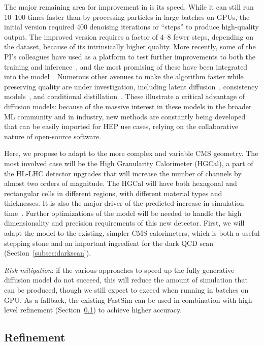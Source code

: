 The major remaining area for improvement in \diffu is its speed.
While it can still run 10--100 times faster than \GEANTfour by processing particles in large batches on GPUs,
the initial version required 400 denoising iterations or ``steps'' to produce high-quality output.
The improved version requires a factor of 4--8 fewer steps, depending on the dataset, because of its intrinsically higher quality.
More recently, some of the PI's colleagues have used \diffu as a platform to test further improvements to both the training and inference~\cite{Jiang:2024ohg},
and the most promising of these have been integrated into the model~\cite{Amram:GitHub}.
Numerous other avenues to make the algorithm faster while preserving quality are under investigation,
including latent diffusion~\cite{Rombach:2022}, consistency models~\cite{Song:2023}, and conditional distillation~\cite{Mei:2023}.
These illustrate a critical advantage of diffusion models:
because of the massive interest in these models in the broader ML community and in industry,
new methods are constantly being developed that can be easily imported for HEP use cases,
relying on the collaborative nature of open-source software.

Here, we propose to adapt \diffu to the more complex and variable CMS geometry.
The most involved case will be the High Granularity Calorimeter (HGCal), a part of the HL-LHC detector upgrades
that will increase the number of channels by almost two orders of magnitude.
The HGCal will have both hexagonal and rectangular cells in different regions, with different material types and thicknesses.
It is also the major driver of the predicted increase in \GEANTfour simulation time~\cite{Pedro:2020kbk}.
Further optimizations of the \diffu model will be needed to handle the high dimensionality and precision requirements of this new detector.
First, we will adapt the model to the existing, simpler CMS calorimeters,
which is both a useful stepping stone and an important ingredient for the dark QCD scan (Section~\ref{subsec:darkscan}).

\textit{Risk mitigation}: if the various approaches to speed up the fully generative diffusion model do not succeed,
this will reduce the amount of simulation that can be produced,
though we still expect to exceed \GEANTfour when running in batches on GPU.
As a fallback, the existing FastSim can be used in combination with high-level refinement (Section~\ref{subsec:refine}) to achieve higher accuracy.

\subsection{Refinement}\label{subsec:refine}

